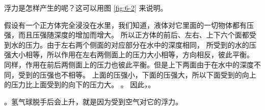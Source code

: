 浮力是怎样产生的呢？这可以用图 \ref{fig:6-2} 来说明。

假设有一个正方体完全浸没在水里，我们知道，液体对它里面的一切物体都有压强，而且压强随深度的增加而增大。
所以正方体的前后、左右、上下六个面都受到水的压力。由于左右两个侧面的对应部分在水中的深度相同，
所受到的水的压强大小相等，所以作用在左右两侧面上的压力大小相等，方向相反，彼此平衡。
同样，作用在前后两侧面上的压力也彼此平衡。但是上下两面由于在水中的深度不同，受到的压强也不相等。
上面的压强小，下面的压强大，所以下面受到的向上的压力比上面受到的向下的压力大。
。
因此，。

。氢气球脱手后会上升，就是因为受到空气对它的浮力。

